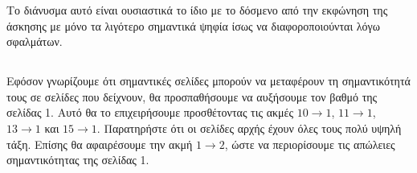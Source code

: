 \documentclass[a4paper,11pt]{article}
\begin{document}
Το διάνυσμα αυτό είναι ουσιαστικά το ίδιο με το δόσμενο από την εκφώνηση της άσκησης με μόνο τα λιγότερο σημαντικά ψηφία ίσως να διαφοροποιούνται λόγω σφαλμάτων.

\subsection{} %

Εφόσον γνωρίζουμε ότι σημαντικές σελίδες μπορούν να μεταφέρουν τη σημαντικότητά τους  σε σελίδες που δείχνουν, θα προσπαθήσουμε να αυξήσουμε τον βαθμό της σελίδας 1. Αυτό θα το επιχειρήσουμε προσθέτοντας τις ακμές $10\rightarrow 1$, $11\rightarrow 1$, $13\rightarrow 1$ και $15\rightarrow 1$. Παρατηρήστε ότι οι σελίδες αρχής έχουν όλες τους πολύ υψηλή τάξη. Επίσης θα αφαιρέσουμε την ακμή $1\rightarrow 2$, ώστε να περιορίσουμε τις απώλειες σημαντικότητας της σελίδας 1.

\begin{table}[H]
    \centering
    \caption{Σύγκριση των τάξεων των σελίδων (3)}
    \label{fig:4_1}
\end{table}
\end{document}
